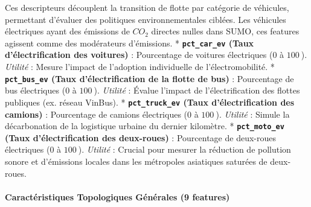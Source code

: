 \documentclass[10pt, a4paper]{article}
\begin{document}
Ces descripteurs découplent la transition de flotte par catégorie de
véhicules, permettant d'évaluer des politiques environnementales
ciblées. Les véhicules électriques ayant des émissions de \(CO_2\)
directes nulles dans SUMO, ces features agissent comme des modérateurs
d'émissions. * \textbf{\texttt{pct\_car\_ev} (Taux d'électrification des
voitures)} : Pourcentage de voitures électriques (\(0\) à \(100\ %
\)). \emph{Utilité} : Mesure l'impact de l'adoption individuelle de
l'électromobilité. * \textbf{\texttt{pct\_bus\_ev} (Taux
d'électrification de la flotte de bus)} : Pourcentage de bus électriques
(\(0\) à \(100\ %
\)). \emph{Utilité} : Évalue l'impact de l'électrification des flottes
publiques (ex. réseau VinBus). * \textbf{\texttt{pct\_truck\_ev} (Taux
d'électrification des camions)} : Pourcentage de camions électriques
(\(0\) à \(100\ %
\)). \emph{Utilité} : Simule la décarbonation de la logistique urbaine
du dernier kilomètre. * \textbf{\texttt{pct\_moto\_ev} (Taux
d'électrification des deux-roues)} : Pourcentage de deux-roues
électriques (\(0\) à \(100\ %
\)). \emph{Utilité} : Crucial pour mesurer la réduction de pollution
sonore et d'émissions locales dans les métropoles asiatiques saturées de
deux-roues.

\paragraph{Caractéristiques Topologiques Générales (9
features)}\label{caractuxe9ristiques-topologiques-guxe9nuxe9rales-9-features}
\end{document}
